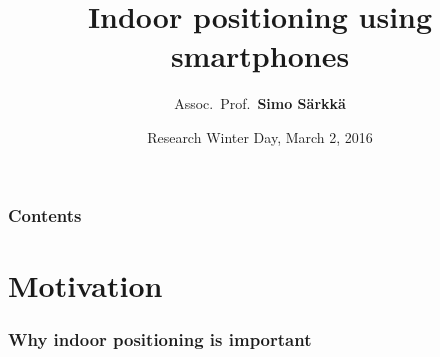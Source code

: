 \documentclass[xcolor=svgnames,english,presentation]{beamer}
\title{Indoor positioning using smartphones}
\author[Simo S\"arkk\"a]{Assoc.~Prof.~{\bf Simo S\"arkk\"a}}
\institute[EEA Department]{\balert{EEA Department / ELEC@Aalto}} %
\date[March 2, 2016]{\alert{Research Winter Day, March 2, 2016}}
\begin{document}

\begin{frame}
  \titlepage
\end{frame}


\begin{frame}
  \frametitle{Contents}
  \tableofcontents[pausesections]
\end{frame}

\section{Motivation}

\begin{frame}
  \frametitle{Why indoor positioning is important}


  \begin{columns}
  \begin{column}{0.7\textwidth}
  \begin{itemize}[<+->]



\end{itemize}
\end{column}
\end{columns}
\end{frame}
\end{document}
